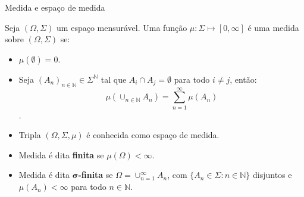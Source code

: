\documentclass[11pt]{beamer}
\begin{document}
\begin{frame}{Medida e espaço de medida}
\begin{definition}
Seja $(\Omega, \Sigma)$ um espaço mensurável. Uma função $\mu: \Sigma \mapsto [0,\infty]$ é uma medida sobre $(\Omega, \Sigma)$ se:
\begin{itemize}
	\item $\mu(\emptyset) = 0$.
	\item Seja $(A_n)_{n \in \mathbb{N} }\in \Sigma^\mathbb{N}$ tal que $A_i \cap A_j = \emptyset$ para todo $i \neq j$, então:
	$$\mu\left(\cup_{n \in \mathbb{N}} A_n\right) = \sum_{n=1}^\infty \mu(A_n)$$.
\end{itemize}
\end{definition}
\vspace{1em}
\begin{itemize}
	\item Tripla $(\Omega, \Sigma, \mu)$ é conhecida como espaço de medida.
	\item Medida é dita \textbf{finita} se $\mu(\Omega) < \infty$.
	\item Medida é dita \textbf{$\boldsymbol{\sigma}$-finita} se $\Omega = \cup_{n=1}^\infty A_n$, com $\{A_n \in \Sigma: n \in \mathbb{N}\}$ disjuntos e $\mu(A_n) < \infty$ para todo $n \in \mathbb{N}$. 
\end{itemize}
\end{frame}
\end{document}
